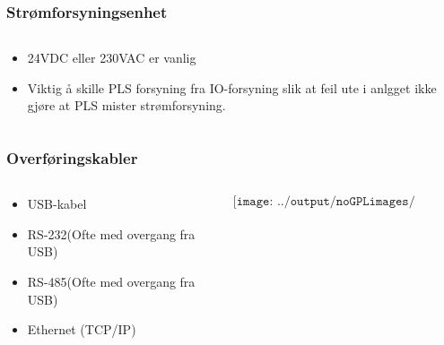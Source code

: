 \documentclass[aspectratio=169,xcolor=dvipsnames]{beamer}
\begin{document}
\begin{frame}
	\frametitle{Strømforsyningsenhet}
	\begin{columns}
		\begin{column}{0.5\textwidth}
			\begin{itemize}
				\item 24VDC eller 230VAC er vanlig
				\item Viktig å skille PLS forsyning fra IO-forsyning slik at feil ute i anlgget ikke gjøre at PLS mister strømforsyning. 
			\end{itemize}

			
		\end{column}

	\end{columns}
\end{frame}

\begin{frame}
	\frametitle{Overføringskabler}
	\begin{columns}
		\begin{column}{0.5\textwidth}
			\begin{itemize}
				\item USB-kabel
				\item RS-232(Ofte med overgang fra USB)
				\item RS-485(Ofte med overgang fra USB)
				\item Ethernet (TCP/IP)
			\end{itemize}

			
		\end{column}

		\begin{column}{0.5\textwidth}
	$$\texttt{[image: ../output/noGPLimages/pls02.png]}$$
		\end{column}
	\end{columns}
\end{frame}
\end{document}

